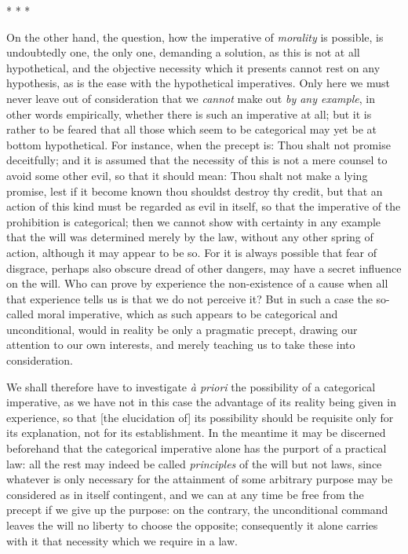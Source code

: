 \begin{center}* * *\end{center}

On the other hand, the question, how the imperative of
\textit{morality} is possible, is undoubtedly one, the only one,
demanding a solution, as this is not at all hypothetical, and the
objective necessity which it presents cannot rest on any hypothesis,
as is the ease with the hypothetical imperatives. Only here we must
never leave out of consideration that we \textit{cannot} make out
\textit{by any example}, in other words empirically, whether there is
such an imperative at all; but it is rather to be feared that all
those which seem to be categorical may yet be at bottom hypothetical.
For instance, when the precept is: Thou shalt not promise deceitfully;
and it is assumed that the necessity of this is not a mere counsel to
avoid some other evil, so that it should mean: Thou shalt not make a
lying promise, lest if it become known thou shouldst destroy thy
credit, but that an action of this kind must be regarded as evil in
itself, so that the imperative of the prohibition is categorical; then
we cannot  show with certainty in any example that the will
was determined merely by the law, without any other spring of action,
although it may appear to be so. For it is always possible that fear
of disgrace, perhaps also obscure dread of other dangers, may have a
secret influence on the will. Who can prove by experience the
non-existence of a cause when all that experience tells us is that we
do not perceive it? But in such a case the so-called moral imperative,
which as such appears to be categorical and unconditional, would in
reality be only a pragmatic precept, drawing our attention to our own
interests, and merely teaching us to take these into consideration.

We shall therefore have to investigate \textit{\`a priori} the
possibility of a categorical imperative, as we have not in this case
the advantage of its reality being given in experience, so that [the
elucidation of] its possibility should be requisite only for its
explanation, not for its establishment. In the meantime it may be
discerned beforehand that the categorical imperative alone has the
purport of a practical law: all the rest may indeed be called
\textit{principles} of the will but not laws, since whatever is only
necessary for the attainment of some arbitrary purpose may be
considered as in itself contingent, and we can at any time be free
from the precept if we give up the purpose: on the contrary, the
unconditional command leaves the will no liberty to choose the
opposite; consequently it alone carries with it that necessity which
we require in a law.

